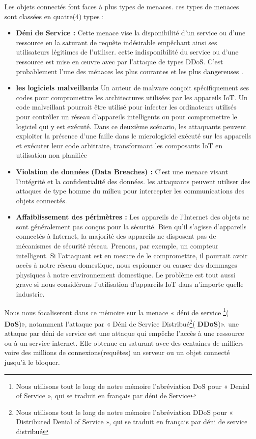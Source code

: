 \documentclass[a4paper,12pt]{report}
\begin{document}
Les objets connectés font faces à plus types de menaces. ces types de menaces sont classées en quatre(4) types \cite{refinfosec} : 
\begin{itemize}
\item \textbf{Déni de Service :} Cette menace vise la disponibilité d'un service ou d'une ressource en la saturant de requête indésirable empêchant ainsi ses utilisateurs légitimes de l'utiliser. cette indisponibilité du service ou d'une ressource est mise en œuvre avec par l'attaque de types DDoS. C'est probablement l'une des ménaces les plus courantes et les plus dangereuses . 
\item \textbf{les logiciels malveillants} Un auteur de malware conçoit spécifiquement ses codes pour compromettre les architectures utilisées par les appareils IoT. Un code malveillant pourrait être utilisé pour infecter les ordinateurs utilisés pour contrôler un réseau d'appareils intelligents ou pour compromettre le logiciel qui y est exécuté. Dans ce deuxième scénario, les attaquants peuvent exploiter la présence d'une faille dans le micrologiciel exécuté sur les appareils et exécuter leur code arbitraire, transformant les composants IoT en utilisation non planifiée \cite{refinfosec}
\item \textbf{Violation de données (Data Breaches) : } C'est une menace visant l'intégrité et la confidentialité des données. les attaquants peuvent utiliser des attaques de type homme du milieu pour intercepter les communications des objets connectés.  
\item \textbf{Affaiblissement des périmètres : } Les appareils de l'Internet des objets ne sont généralement pas conçus pour la sécurité. Bien qu'il s'agisse d'appareils connectés à Internet, la majorité des appareils ne disposent pas de mécanismes de sécurité réseau. Prenons, par exemple, un compteur intelligent. Si l'attaquant est en mesure de le compromettre, il pourrait avoir accès à notre réseau domestique, nous espionner ou causer des dommages physiques à notre environnement domestique. Le problème est tout aussi grave si nous considérons l'utilisation d'appareils IoT dans n'importe quelle industrie.\cite{refinfosec}
\end{itemize}

Nous nous focaliseront dans ce mémoire sur la menace « déni de service \footnote{Nous utilisons tout le long de notre mémoire l’abréviation DoS pour « Denial of Service », qui se traduit en français par déni de Service}( \textbf{DoS})», notamment l'attaque par « Déni de Service Distribué\footnote{Nous utilisons tout le long de notre mémoire l’abréviation DDoS pour « Distributed Denial of Service », qui se traduit en français par déni de service distribué}( \textbf{DDoS})». une attaque par déni de service est une attaque qui empêche l'accès à une ressource ou à un service internet. Elle obtenue en saturant avec des centaines de milliers voire des millions de connexions(requêtes) un serveur ou un objet connecté jusqu'à le bloquer.\\
\end{document}
